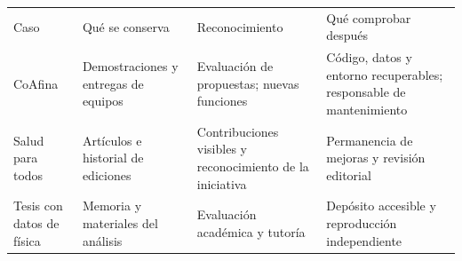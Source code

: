 \documentclass[border=0pt]{standalone}
\begin{document}
\begin{minipage}{160mm}\small
\begin{tabularx}{160mm}{@{}p{22mm}XXX@{}}\toprule
Caso & Qué se conserva & Reconocimiento & Qué comprobar después \\
CoAfina & Demostraciones y entregas de equipos & Evaluación de propuestas; nuevas funciones & Código, datos y entorno recuperables; responsable de mantenimiento \\
Salud para todos & Artículos e historial de ediciones & Contribuciones visibles y reconocimiento de la iniciativa & Permanencia de mejoras y revisión editorial \\
Tesis con datos de física & Memoria y materiales del análisis & Evaluación académica y tutoría & Depósito accesible y reproducción independiente \\
\bottomrule\end{tabularx}\end{minipage}
\end{document}
